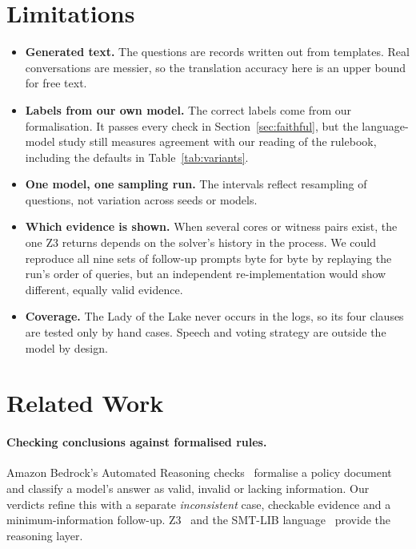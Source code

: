 \documentclass[runningheads]{llncs}
\newcommand{\vd}[1]{\emph{#1}}             %
\begin{document}
\section{Limitations}\label{sec:limits}
\begin{itemize}[leftmargin=1.2em]
\item \textbf{Generated text.} The questions are records written out from templates. Real conversations are messier,
so the translation accuracy here is an upper bound for free text.
\item \textbf{Labels from our own model.} The correct labels come from our formalisation. It passes every check in
Section~\ref{sec:faithful}, but the language-model study still measures agreement with our reading of the rulebook,
including the defaults in Table~\ref{tab:variants}.
\item \textbf{One model, one sampling run.} The intervals reflect resampling of questions, not variation across seeds
or models.
\item \textbf{Which evidence is shown.} When several cores or witness pairs exist, the one Z3 returns depends on the
solver's history in the process. We could reproduce all nine sets of follow-up prompts byte for byte by replaying the
run's order of queries, but an independent re-implementation would show different, equally valid evidence.
\item \textbf{Coverage.} The Lady of the Lake never occurs in the logs, so its four clauses are tested only by hand
cases. Speech and voting strategy are outside the model by design.
\end{itemize}

\section{Related Work}
\paragraph{Checking conclusions against formalised rules.}
Amazon Bedrock's Automated Reasoning checks~\cite{aws2025ar} formalise a policy document and classify a model's
answer as valid, invalid or lacking information. Our verdicts refine this with a separate \vd{inconsistent} case,
checkable evidence and a minimum-information follow-up. Z3~\cite{demoura2008z3} and the SMT-LIB
language~\cite{barrett2017smtlib} provide the reasoning layer.
\end{document}
